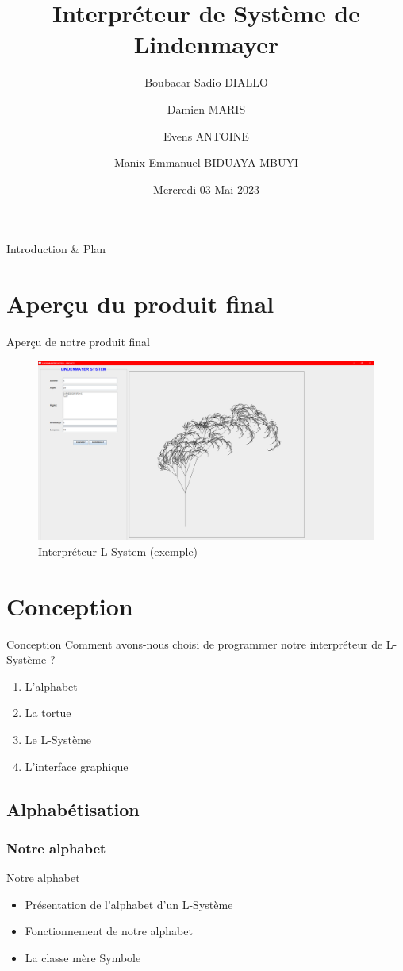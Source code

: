 \documentclass{beamer}
\title{Interpréteur de Système de Lindenmayer}
\author{Boubacar Sadio DIALLO \and Damien MARIS \and Evens ANTOINE \and Manix-Emmanuel BIDUAYA MBUYI}
\date{Mercredi 03 Mai 2023}
\begin{document}
\frame{\titlepage}

\begin{frame}{Introduction \& Plan }
    \tableofcontents
\end{frame}
\section{Aperçu du produit final}
\begin{frame}{Aperçu de notre produit final}
    \begin{figure}[h]
	   \includegraphics[width=\textwidth]{./images/ArbreFractal.png}
	   \caption{Interpréteur L-System (exemple)}
    \end{figure}
\end{frame}

\section{Conception}
\begin{frame}{Conception}
     Comment avons-nous choisi de programmer notre interpréteur de L-Système ?
     \begin{enumerate}
         \item L'alphabet
         \item La tortue
         \item Le L-Système
         \item L'interface graphique
     \end{enumerate}
\end{frame}
\subsection{Alphabétisation}

\subsubsection{Notre alphabet}
\begin{frame}{Notre alphabet}
    \begin{itemize}
        \item Présentation de l'alphabet d'un L-Système
        \item Fonctionnement de notre alphabet
        \item La classe mère Symbole
    \end{itemize}
\end{frame}
\end{document}
